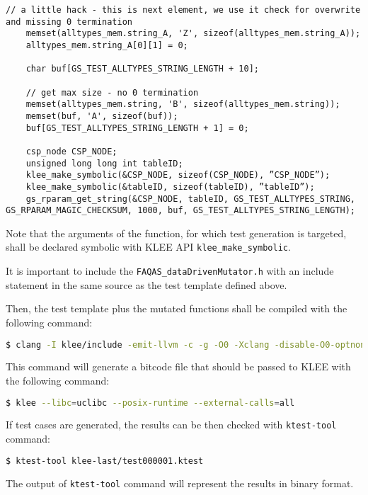\begin{lstlisting}[style=CStyle, caption=Test template to enable data-driven mutation testing, label=GSLtest]
    // a little hack - this is next element, we use it check for overwrite and missing 0 termination
    memset(alltypes_mem.string_A, 'Z', sizeof(alltypes_mem.string_A));
    alltypes_mem.string_A[0][1] = 0;

    char buf[GS_TEST_ALLTYPES_STRING_LENGTH + 10];

    // get max size - no 0 termination
    memset(alltypes_mem.string, 'B', sizeof(alltypes_mem.string));
    memset(buf, 'A', sizeof(buf));
    buf[GS_TEST_ALLTYPES_STRING_LENGTH + 1] = 0;
    
    csp_node CSP_NODE;
    unsigned long long int tableID;
    klee_make_symbolic(&CSP_NODE, sizeof(CSP_NODE), ”CSP_NODE”);
    klee_make_symbolic(&tableID, sizeof(tableID), ”tableID”);
    gs_rparam_get_string(&CSP_NODE, tableID, GS_TEST_ALLTYPES_STRING, GS_RPARAM_MAGIC_CHECKSUM, 1000, buf, GS_TEST_ALLTYPES_STRING_LENGTH);
\end{lstlisting}

Note that the arguments of the function, for which test generation is targeted, shall be declared symbolic with  KLEE API \texttt{klee\_make\_symbolic}.

It is important to include the \texttt{FAQAS\_dataDrivenMutator.h} with an include statement in the same source as the test template defined above.

Then, the test template plus the mutated functions shall be compiled with the following command:

\begin{lstlisting}[language=bash]
 $ clang -I klee/include -emit-llvm -c -g -O0 -Xclang -disable-O0-optnone source.c
\end{lstlisting}

This command will generate a bitcode file that should be passed to KLEE with the following command:

\begin{lstlisting}[language=bash]
 $ klee --libc=uclibc --posix-runtime --external-calls=all
\end{lstlisting}

If test cases are generated, the results can be then checked with \texttt{ktest-tool} command:

\begin{lstlisting}[language=bash]
 $ ktest-tool klee-last/test000001.ktest
\end{lstlisting}

The output of \texttt{ktest-tool} command will represent the results in binary format.
